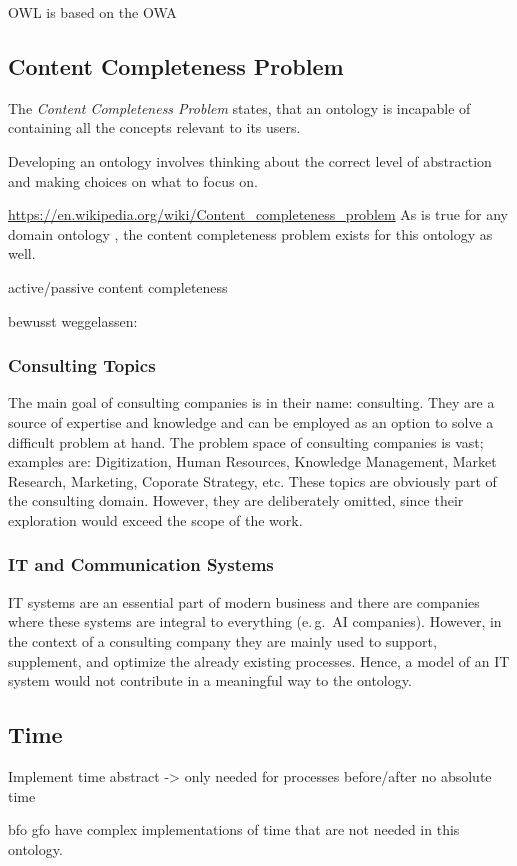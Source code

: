 \documentclass[a4paper, DIV=13, BCOR=0cm]{scrbook}
\newcommand{\eg}{e.\,g.\ }
\begin{document}
OWL is based on the OWA \cite[p.\,389]{moore2015context}
\subsection{Content Completeness Problem}
The \textit{Content Completeness Problem} states, that an ontology is incapable of containing all the concepts relevant to its users.

Developing an ontology involves thinking about the correct level of abstraction and making choices on what to focus on.

\url{https://en.wikipedia.org/wiki/Content_completeness_problem}
As is true for any domain ontology \cite{CN}, the content completeness problem exists for this ontology as well.

active/passive content completeness

bewusst weggelassen:
\subsubsection{Consulting Topics}
The main goal of consulting companies is in their name: consulting. They are a source of expertise and knowledge and can be employed as an option to solve a difficult problem at hand. The problem space of consulting companies is vast; examples are: Digitization, Human Resources, Knowledge Management, Market Research, Marketing, Coporate Strategy, etc. These topics are obviously part of the consulting domain. However, they are deliberately omitted, since their exploration would exceed the scope of the work.

\subsubsection{IT and Communication Systems}
IT systems are an essential part of modern business and there are companies where these systems are integral to everything (\eg AI companies). However, in the context of a consulting company they are mainly used to support, supplement, and optimize the already existing processes. Hence, a model of an IT system would not contribute in a meaningful way to the ontology.

\subsection{Time}
\label{time}
Implement time abstract -> only needed for processes before/after
no absolute time

\gls{bfo} \gls{gfo} have complex implementations of time that are not needed in this ontology.
\end{document}
